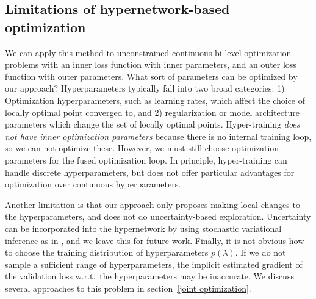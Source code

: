 \documentclass{article} %
\newcommand{\hyper}{\lambda} %
\begin{document}
\subsection{Limitations of hypernetwork-based optimization}
We can apply this method to unconstrained continuous bi-level optimization problems with an inner loss function with inner parameters, and an outer loss function with outer parameters.
What sort of parameters can be optimized by our approach?
Hyperparameters typically fall into two broad categories:
1) Optimization hyperparameters, such as learning rates, which affect the choice of locally optimal point converged to, and
2) regularization or model architecture parameters which change the set of locally optimal points.
Hyper-training \emph{does not have inner optimization parameters} because there is no internal training loop, so we can not optimize these.
However, we must still choose optimization parameters for the fused optimization loop.
In principle, hyper-training can handle discrete hyperparameters, but does not offer particular advantages for optimization over continuous hyperparameters.

Another limitation is that our approach only proposes making local changes to the hyperparameters, and does not do uncertainty-based exploration.
Uncertainty can be incorporated into the hypernetwork by using stochastic variational inference as in \citet{blundell2015weight}, and we leave this for future work.
Finally, it is not obvious how to choose the training distribution of hyperparameters $p(\hyper)$.
If we do not sample a sufficient range of hyperparameters, the implicit estimated gradient of the validation loss w.r.t.\ the hyperparameters may be inaccurate.
We discuss several approaches to this problem in section~\ref{joint optimization}.
\end{document}
